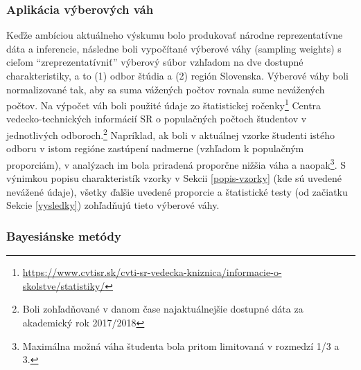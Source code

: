 \documentclass[
]{article}
\DeclareRobustCommand{\href}[2]{#2\footnote{\url{#1}}}
\begin{document}
\hypertarget{aplikuxe1cia-vuxfdberovuxfdch-vuxe1h}{%
\subsubsection{Aplikácia výberových váh}\label{aplikuxe1cia-vuxfdberovuxfdch-vuxe1h}}

Keďže ambíciou aktuálneho výskumu bolo produkovať národne reprezentatívne dáta a inferencie, následne boli vypočítané výberové váhy (sampling weights) s cieľom ``zreprezentatívniť'' výberový súbor vzhľadom na dve dostupné charakteristiky, a to (1) odbor štúdia a (2) región Slovenska. Výberové váhy boli normalizované tak, aby sa suma vážených počtov rovnala sume nevážených počtov. Na výpočet váh boli použité údaje zo \href{https://www.cvtisr.sk/cvti-sr-vedecka-kniznica/informacie-o-skolstve/statistiky/}{štatistickej ročenky} Centra vedecko-technických informácií SR o populačných počtoch študentov v jednotlivých odboroch.\footnote{Boli zohľadňované v danom čase najaktuálnejšie dostupné dáta za akademický rok 2017/2018} Napríklad, ak boli v aktuálnej vzorke študenti istého odboru v istom regióne zastúpení nadmerne (vzhľadom k populačným proporciám), v analýzach im bola priradená proporčne nižšia váha a naopak\footnote{Maximálna možná váha študenta bola pritom limitovaná v rozmedzí 1/3 a 3.}. S výnimkou popisu charakteristík vzorky v Sekcii \ref{popis-vzorky} (kde sú uvedené nevážené údaje), všetky ďalšie uvedené proporcie a štatistické testy (od začiatku Sekcie \ref{vysledky}) zohľadňujú tieto výberové váhy.

\hypertarget{bayesiuxe1nske-metuxf3dy}{%
\subsubsection{Bayesiánske metódy}\label{bayesiuxe1nske-metuxf3dy}}
\end{document}
